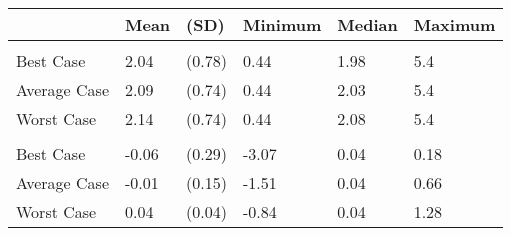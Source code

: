 \begin{tabular}[t]{llllll}
\toprule
 & Mean & (SD) & Minimum & Median & Maximum\\
\midrule
\addlinespace[0.3em]
\multicolumn{6}{l}{\textbf{Prices}}\\
\hspace{1em}Best Case & 2.04 & (0.78) & 0.44 & 1.98 & 5.4\\
\hspace{1em}Average Case & 2.09 & (0.74) & 0.44 & 2.03 & 5.4\\
\hspace{1em}Worst Case & 2.14 & (0.74) & 0.44 & 2.08 & 5.4\\
\addlinespace[0.3em]
\multicolumn{6}{l}{\textbf{Price Change}}\\
\hspace{1em}Best Case & -0.06 & (0.29) & -3.07 & 0.04 & 0.18\\
\hspace{1em}Average Case & -0.01 & (0.15) & -1.51 & 0.04 & 0.66\\
\hspace{1em}Worst Case & 0.04 & (0.04) & -0.84 & 0.04 & 1.28\\
\bottomrule
\end{tabular}
